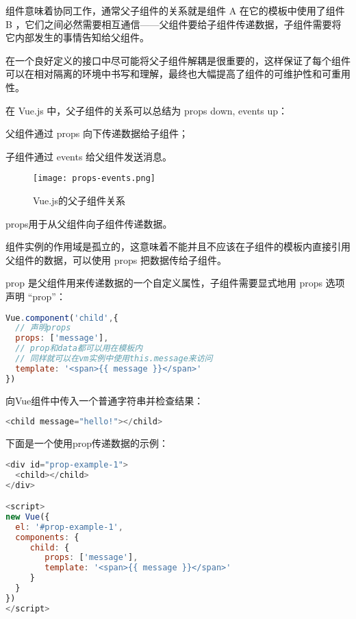 组件意味着协同工作，通常父子组件的关系就是组件 A 在它的模板中使用了组件 B ，它们之间必然需要相互通信——父组件要给子组件传递数据，子组件需要将它内部发生的事情告知给父组件。

在一个良好定义的接口中尽可能将父子组件解耦是很重要的，这样保证了每个组件可以在相对隔离的环境中书写和理解，最终也大幅提高了组件的可维护性和可重用性。

在 Vue.js 中，父子组件的关系可以总结为 props down, events up：

\begin{compactitem}
\item 父组件通过 props 向下传递数据给子组件；
\item 子组件通过 events 给父组件发送消息。
\end{compactitem}

\begin{figure}[htbp]
\centering
\texttt{[image: props-events.png]}
\caption{Vue.js的父子组件关系}
\end{figure}



props用于从父组件向子组件传递数据。

组件实例的作用域是孤立的，这意味着不能并且不应该在子组件的模板内直接引用父组件的数据，可以使用 props 把数据传给子组件。

prop 是父组件用来传递数据的一个自定义属性，子组件需要显式地用 props 选项声明 “prop”：

\begin{lstlisting}[language=JavaScript]
Vue.component('child',{
  // 声明props
  props: ['message'],
  // prop和data都可以用在模板内
  // 同样就可以在vm实例中使用this.message来访问
  template: '<span>{{ message }}</span>'
})
\end{lstlisting}

向Vue组件中传入一个普通字符串并检查结果：


\begin{lstlisting}[language=JavaScript]
<child message="hello!"></child>
\end{lstlisting}

下面是一个使用prop传递数据的示例：

\begin{lstlisting}[language=JavaScript]
<div id="prop-example-1">
  <child></child>
</div>

<script>
new Vue({
  el: '#prop-example-1',
  components: {
     child: {
        props: ['message'],
        template: '<span>{{ message }}</span>'
     }
  }
})
</script>
\end{lstlisting}



